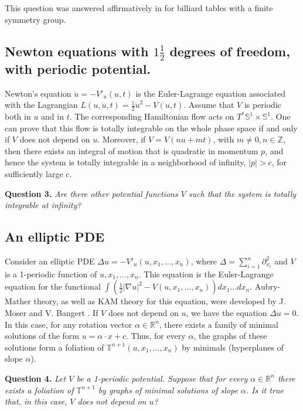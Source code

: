 \documentclass[11pt]{article}
\theoremstyle{definition}
\begin{document}
This question was answered affirmatively in \cite{IMRN} for billiard tables with a finite symmetry group. 
\medskip

\subsection*{Newton equations with $1\frac 12$ degrees of freedom, with periodic potential.}

Newton's equation $\ddot u=-V'_u(u,t)$ is the Euler-Lagrange equation associated with the Lagrangian $L(u,\dot u, t)=\frac 12\dot u^2-V(u,t)$. Assume that $V$ is periodic both in $u$ and in $t$. The corresponding Hamiltonian flow acts on $T^*\mathbb S^1\times\mathbb S^1$. One can prove that this flow is totally integrable on the whole phase space if and only if $V$ does not depend on $u$. 
Moreover, if $V=V(nu+mt)$, with $ m\neq0, n\in\mathbb Z$, then there exists an integral of motion that is quadratic in momentum $p$, and hence the system is totally integrable in a neighborhood of infinity, $|p|>c$, for sufficiently large $c$.

{\bf Question 3.} {\it Are there other potential functions $V$ such that the system is totally integrable at infinity?}
\medskip

\subsection*{An elliptic PDE}

Consider an elliptic PDE  $\Delta u=-V'_u(u, x_1, \ldots ,x_n)$, where $\Delta=\sum_{i=1}^{n}\partial^2_{x_i}$ and $V$ is a 1-periodic function of $u, x_1,\ldots ,x_n$. This equation is the Euler-Lagrange equation for the functional $\int \left( \frac 12|\nabla u|^2-V(u, x_1, \ldots, x_n)\right) dx_1 \ldots dx_n$. Aubry-Mather theory, as well as KAM theory for this equation, were developed by J. Moser \cite{moser} and V. Bangert \cite{bangert}. If $V$ does not depend on $u$, we have the equation $\Delta u=0$. In this case, for any rotation vector $\alpha\in \mathbb R^n$, there exists a family of minimal solutions of the form $u=\alpha\cdot x+c$. Thus, for every $\alpha$, the graphs of these solutions form a foliation of $\mathbb T^{n+1}(u,x_1, \ldots, x_n)$ by minimals (hyperplanes of slope $\alpha$).

{\bf Question 4.} {\it Let $V$ be a 1-periodic potential. Suppose that for every $\alpha \in \mathbb R^n$ there exists a foliation of $\mathbb T^{n+1}$ by graphs of minimal solutions of slope $\alpha$. Is it true that, in this case, $V$ does not depend on $u$?}
\end{document}
